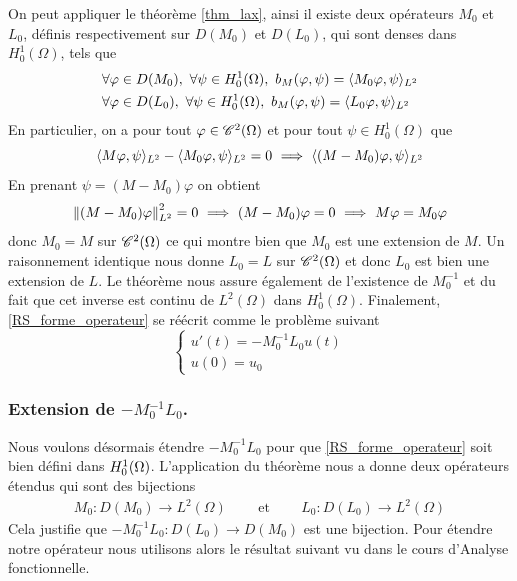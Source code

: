 On peut appliquer le théorème \ref{thm_lax}, ainsi il existe deux opérateurs $M_0$ et $L_0$, définis respectivement sur $D(M_0)$ et $D(L_0)$, qui sont denses dans $H^1_0(\Omega)$, tels que
\begin{align*}
    &\forall \varphi \in D(M_0),\ \forall \psi \in H^1_0(\Omega), \ b_M(\varphi, \psi) = \ps{M_0\varphi}{\psi}_{L^2} \\
    &\forall \varphi \in D(L_0),\ \forall \psi \in H^1_0(\Omega), \ b_M(\varphi, \psi) = \ps{L_0\varphi}{\psi}_{L^2}
\end{align*}
En particulier, on a pour tout $\varphi \in \mathscr{C}^2(\Omega)$ et pour tout $\psi \in H^1_0(\Omega)$ que
$$ \ps{M\varphi}{\psi}_{L^2} - \ps{M_0\varphi}{\psi}_{L^2} = 0 \ \Longrightarrow \ \ps{(M-M_0)\varphi}{\psi}_{L^2} $$
En prenant $\psi = (M-M_0)\varphi$ on obtient
\begin{equation*}
    \left\lVert (M-M_0)\varphi \right\rVert^2_{L^2} = 0 \ \Longrightarrow \ (M-M_0)\varphi = 0
    \ \Longrightarrow \ M\varphi = M_0 \varphi
\end{equation*}
donc $M_0=M$ sur $\mathscr{C}^2(\Omega)$ ce qui montre bien que $M_0$ est une extension de $M$. Un raisonnement identique nous donne $L_0 = L$ sur $\mathscr{C}^2(\Omega)$ et donc $L_0$ est bien une extension de $L$. Le théorème nous assure également de l'existence de $M^{-1}_0$ et du fait que cet inverse est continu de $L^2(\Omega)$ dans $H^1_0(\Omega)$. Finalement, \eqref{RS_forme_operateur} se réécrit comme le problème suivant
\begin{equation}\label{edo_ML}
\begin{cases}
    u'(t) = -M^{-1}_0 L_0u(t)  \\
    u(0) = u_0
\end{cases}
\end{equation}

\subsubsection*{Extension de \texorpdfstring{$-M^{-1}_0 L_0$}{M-1\_0 L\_0}.}
Nous voulons désormais étendre $-M^{-1}_0 L_0$ pour que \eqref{RS_forme_operateur} soit bien défini dans $H^1_0(\Omega)$. L'application du théorème nous a donne deux opérateurs étendus qui sont des bijections
\begin{eqnarray*}
    M_0 : D(M_0) \longrightarrow L^2(\Omega) \ \ \ \ \ &\text{ et }& \ \ \ \ \ L_0 : D(L_0) \longrightarrow L^2(\Omega)
\end{eqnarray*}
Cela justifie que  $-M^{-1}_0L_0 : D(L_0)\longrightarrow D(M_0)$ est une bijection. Pour étendre notre opérateur nous utilisons alors le résultat suivant vu dans le cours d'Analyse fonctionnelle.

